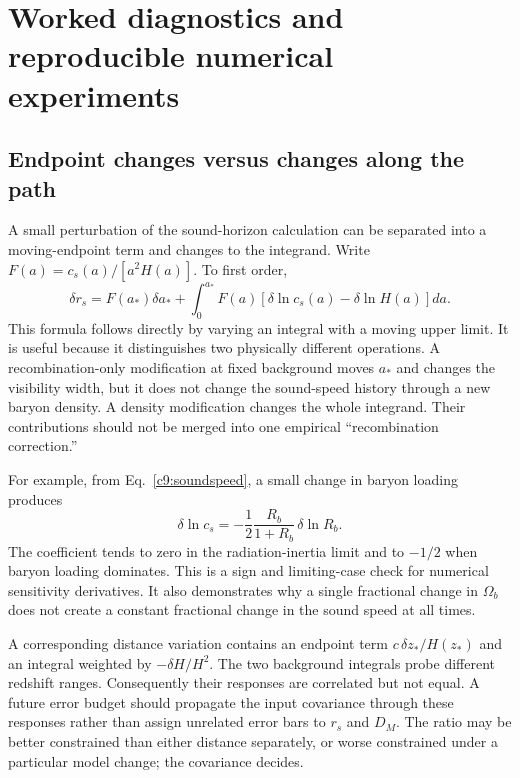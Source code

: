 \section{Worked diagnostics and reproducible numerical experiments}
\subsection{Endpoint changes versus changes along the path}

A small perturbation of the sound-horizon calculation can be separated into a moving-endpoint term and changes to the integrand. Write $F(a)=c_s(a)/[a^2H(a)]$. To first order,
\begin{equation}
 \delta r_s=F(a_*)\delta a_*+
 \int_0^{a_*}F(a)\left[\delta\ln c_s(a)-\delta\ln H(a)\right]da.
 \label{c9:rsvariation}
\end{equation}
This formula follows directly by varying an integral with a moving upper limit. It is useful because it distinguishes two physically different operations. A recombination-only modification at fixed background moves $a_*$ and changes the visibility width, but it does not change the sound-speed history through a new baryon density. A density modification changes the whole integrand. Their contributions should not be merged into one empirical ``recombination correction.''

For example, from Eq.~\eqref{c9:soundspeed}, a small change in baryon loading produces
\begin{equation}
 \delta\ln c_s=-\frac{1}{2}\frac{R_b}{1+R_b}\,\delta\ln R_b.
 \label{c9:csvariation}
\end{equation}
The coefficient tends to zero in the radiation-inertia limit and to $-1/2$ when baryon loading dominates. This is a sign and limiting-case check for numerical sensitivity derivatives. It also demonstrates why a single fractional change in $\Omega_b$ does not create a constant fractional change in the sound speed at all times.

A corresponding distance variation contains an endpoint term $c\,\delta z_*/H(z_*)$ and an integral weighted by $-\delta H/H^2$. The two background integrals probe different redshift ranges. Consequently their responses are correlated but not equal. A future error budget should propagate the input covariance through these responses rather than assign unrelated error bars to $r_s$ and $D_M$. The ratio may be better constrained than either distance separately, or worse constrained under a particular model change; the covariance decides.

